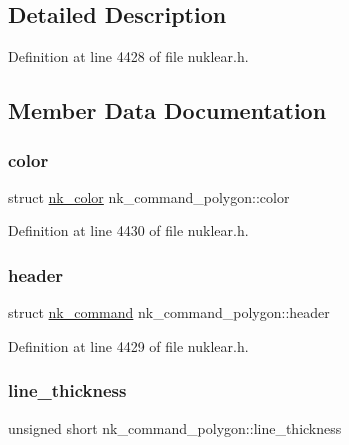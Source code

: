 \subsection{Detailed Description}


Definition at line 4428 of file nuklear.\+h.



\subsection{Member Data Documentation}
\mbox{\label{structnk__command__polygon_ab7b7b39934676870924a6793dc2dc00f}} 
\subsubsection{\texorpdfstring{color}{color}}
{\footnotesize\ttfamily struct \mbox{\hyperlink{structnk__color}{nk\+\_\+color}} nk\+\_\+command\+\_\+polygon\+::color}



Definition at line 4430 of file nuklear.\+h.

\mbox{\label{structnk__command__polygon_a62fcb322cddbbc496b698ac0fe70e811}} 
\subsubsection{\texorpdfstring{header}{header}}
{\footnotesize\ttfamily struct \mbox{\hyperlink{structnk__command}{nk\+\_\+command}} nk\+\_\+command\+\_\+polygon\+::header}



Definition at line 4429 of file nuklear.\+h.

\mbox{\label{structnk__command__polygon_a866c970775ae0a05527d80878f597245}} 
\subsubsection{\texorpdfstring{line\+\_\+thickness}{line\_thickness}}
{\footnotesize\ttfamily unsigned short nk\+\_\+command\+\_\+polygon\+::line\+\_\+thickness}



